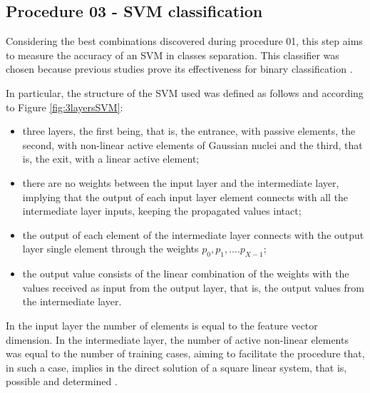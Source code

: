 			
			
			\subsection{Procedure 03 - SVM classification}
			\label{chap:propApproach:sec:Experimento03}

			\par Considering the best combinations discovered during procedure 01, this step aims to measure the accuracy of an SVM in classes separation. This classifier was chosen because previous studies prove its effectiveness for binary classification \cite{bennett2000support}. 
			
			\par In particular, the structure of the SVM used was defined as follows and according to Figure \ref{fig:3layersSVM}: 
			\begin{itemize}
				\item three layers, the first being, that is, the entrance, with passive elements, the second, with non-linear active elements of Gaussian nuclei and the third, that is, the exit, with a linear active element;

				\item there are no weights between the input layer and the intermediate layer, implying that the output of each input layer element connects with all the intermediate layer inputs, keeping the propagated values intact;
				
				\item the output of each element of the intermediate layer connects with the output layer single element through the weights $p_0, p_1, .... p_{X-1}$;

				\item the output value consists of the linear combination of the weights with the values received as input from the output layer, that is, the output values from the intermediate layer.
			\end{itemize}
			
			
			
			\par In the input layer the number of elements is equal to the feature vector dimension. In the intermediate layer, the number of active non-linear elements was equal to the number of training cases, aiming to facilitate the procedure that, in such a case, implies in the direct solution of a square linear system, that is, possible and determined \cite{poole2014linear}. 
			
